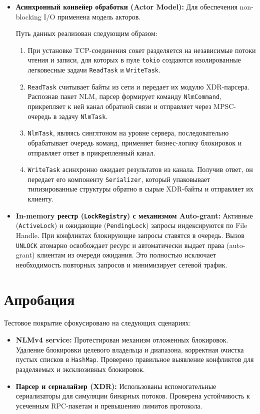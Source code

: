 \documentclass[a4paper]{article}
\begin{document}
\begin{itemize}
    \item \textbf{Асинхронный конвейер обработки (Actor Model):} Для обеспечения non-blocking I/O применена модель акторов.
    
    Путь данных реализован следующим образом:
    \begin{enumerate}
        \item При установке TCP-соединения сокет разделяется на независимые потоки чтения и записи, для которых в пуле \texttt{tokio} создаются изолированные легковесные задачи \texttt{ReadTask} и \texttt{WriteTask}.
        \item \texttt{ReadTask} считывает байты из сети и передает их модулю XDR-парсера. Распознав пакет NLM, парсер формирует команду \texttt{NlmCommand}, прикрепляет к ней канал обратной связи и отправляет через MPSC-очередь в задачу \texttt{NlmTask}.
        \item \texttt{NlmTask}, являясь синглтоном на уровне сервера, последовательно обрабатывает очередь команд, применяет бизнес-логику блокировок и отправляет ответ в прикрепленный канал.
        \item \texttt{WriteTask} асинхронно ожидает результатов из канала. Получив ответ, он передает его компоненту \texttt{Serializer}, который упаковывает типизированные структуры обратно в сырые XDR-байты и отправляет их клиенту.
    \end{enumerate}

    \item \textbf{In-memory реестр (\texttt{LockRegistry}) с механизмом Auto-grant:} 
    Активные (\texttt{ActiveLock}) и ожидающие (\texttt{PendingLock}) запросы индексируются по File Handle. При конфликтах блокирующие запросы ставятся в очередь. Вызов \texttt{UNLOCK} атомарно освобождает ресурс и автоматически выдает права (auto-grant) клиентам из очереди ожидания. Это полностью исключает необходимость повторных запросов и минимизирует сетевой трафик.
\end{itemize}

\section{Апробация}
Тестовое покрытие сфокусировано на следующих сценариях:
\begin{itemize}
    \item \textbf{NLMv4 service:} Протестирован механизм отложенных блокировок. Удаление блокировки целевого владельца и диапазона, корректная очистка пустых списков в \texttt{HashMap}. Проверено правильное выявление конфликтов для разделяемых и эксклюзивных блокировок.
    \item \textbf{Парсер и сериалайзер (XDR):} Использованы вспомогательные сериализаторы для симуляции бинарных потоков. Проверена устойчивость к усеченным RPC-пакетам и превышению лимитов протокола.
\end{itemize}
\end{document}
